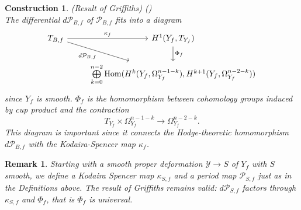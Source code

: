 \documentclass[12pt, english]{article}
\newtheorem{remark}[definition]{Remark}
\newtheorem{construction}[definition]{Construction}
\DeclareMathOperator{\Hom}{Hom}
\begin{document}
\begin{construction} (Result of Griffiths) (\cite[Thm.10.21]{Voi02}) \label{construction_result_of_Griffiths}
	\normalfont \\
	The differential $d \mathcal{P}_{B,f}$ of $\mathcal{P}_{B,f}$ fits into a diagram
	\begin{equation}
		\begin{tikzcd} \label{Commutative_diagram_Kodaira_Spencer_map_dP}
			T_{B,f}  \arrow[swap]{dr}{d \mathcal{P}_{B,f} } \arrow{r}{\kappa_{f}} & H^{1}(Y_f,T_{Y_f})  \arrow{d}{\Phi_f} \\
			& \bigoplus\limits_{k=0}^{n-2} \Hom(H^{k}(Y_f, \Omega_{Y_f}^{n-1-k}), H^{k+1}(Y_f, \Omega_{Y_f}^{n-2-k}))
		\end{tikzcd}
	\end{equation}
	since $Y_f$ is smooth. $\Phi_{f}$ is the homomorphism between cohomology groups induced by cup product and the contraction
	\[ T_{Y_f} \times \Omega_{Y_f}^{n-1-k} \rightarrow \Omega_{Y_f}^{n-2-k}.  \]
	This diagram is important since it connects the Hodge-theoretic homomorphism $d \mathcal{P}_{B,f}$ with the Kodaira-Spencer map $\kappa_f$. 
\end{construction}

\begin{remark}
	\normalfont
	Starting with a smooth proper deformation $\mathcal{Y} \rightarrow S$ of $Y_f$ with $S$ smooth, we define a Kodaira Spencer map $\kappa_{S,f}$ and a period map $\mathcal{P}_{S,f}$ just as in the Definitions above. The result of Griffiths remains valid: $d \mathcal{P}_{S,f}$ factors through $\kappa_{S,f}$ and $\Phi_f$, that is $\Phi_f$ is universal.	
\end{remark}	
\end{document}
